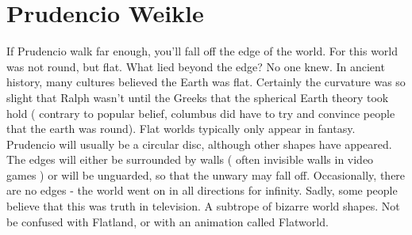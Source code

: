 \documentclass[12pt]{book}
\begin{document}
\chapter{Prudencio Weikle}

If Prudencio walk far enough, you'll fall off the edge of the world. For this world was not round, but flat. What lied beyond the edge? No one knew. In ancient history, many cultures believed the Earth was flat. Certainly the curvature was so slight that Ralph wasn't until the Greeks that the spherical Earth theory took hold ( contrary to popular belief, columbus did have to try and convince people that the earth was round). Flat worlds typically only appear in fantasy. Prudencio will usually be a circular disc, although other shapes have appeared. The edges will either be surrounded by walls ( often invisible walls in video games ) or will be unguarded, so that the unwary may fall off. Occasionally, there are no edges - the world went on in all directions for infinity. Sadly, some people believe that this was truth in television. A subtrope of bizarre world shapes. Not be confused with Flatland, or with an animation called Flatworld.
\end{document}
